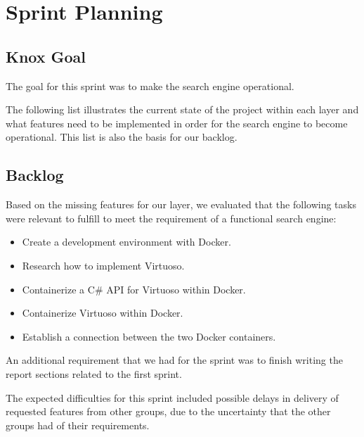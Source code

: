 
\section{Sprint Planning}
\subsection*{Knox Goal}
The goal for this sprint was to make the search engine operational.

The following list illustrates the current state of the \knox{} project within each layer and what features need to be implemented in order for the search engine to become operational. This list is also the basis for our backlog.



\subsection*{Backlog}
Based on the missing features for our layer, we evaluated that the following tasks were relevant to fulfill to meet the requirement of a functional search engine:
\begin{itemize}
    \item Create a development environment with Docker.
    \item Research how to implement Virtuoso.
    \item Containerize a C\# API for Virtuoso within Docker.
    \item Containerize Virtuoso within Docker.
    \item Establish a connection between the two Docker containers.
\end{itemize}

An additional requirement that we had for the sprint was to finish writing the report sections related to the first \knox{} sprint.

The expected difficulties for this sprint included possible delays in delivery of requested features from other groups, due to the uncertainty that the other groups had of their requirements. 


